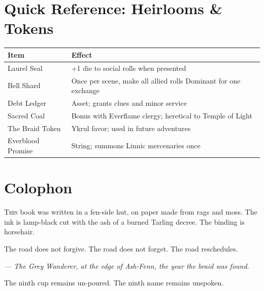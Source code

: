\documentclass[11pt]{book}
\begin{document}
\clearpage

\chapter*{Quick Reference: Heirlooms & Tokens}

\begin{tabular}{|l|l|}
\hline
Item & Effect \\
\hline
Laurel Seal & +1 die to social rolls when presented \\
\hline
Bell Shard & Once per scene, make all allied rolls Dominant for one exchange \\
\hline
Debt Ledger & Asset; grants clues and minor service \\
\hline
Sacred Coal & Bonus with Everflame clergy; heretical to Temple of Light \\
\hline
The Braid Token & Ykrul favor; used in future adventures \\
\hline
Everblood Promise & String; summons Linnic mercenaries once \\
\hline
\end{tabular}

\clearpage
\chapter*{Colophon}

\lettrine{T}{his} book was written in a fen-side hut, on paper made from rags and moss. The ink is lamp-black cut with the ash of a burned Tarling decree. The binding is horsehair.

The road does not forgive. The road does not forget. The road reschedules.

\textit{--- The Grey Wanderer, at the edge of Ash-Fenn, the year the braid was found.}

\vspace{1em}
\noindent The ninth cup remains un-poured. The ninth name remains unspoken.
\end{document}
